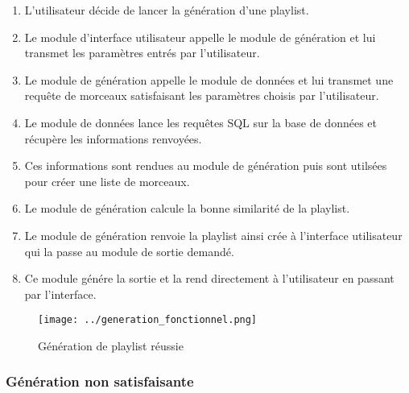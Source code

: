 \begin{enumerate}
\item L'utilisateur décide de lancer la génération d'une playlist.
\item Le module d'interface utilisateur appelle le module de génération et 
lui transmet les paramètres entrés par l'utilisateur.
\item Le module de génération appelle le module de données et lui transmet 
une requête de morceaux satisfaisant les paramètres choisis par l'utilisateur.
\item Le module de données lance les requêtes SQL sur la base de données et
récupère les informations renvoyées.
\item Ces informations sont rendues au module de génération puis sont 
utilsées pour créer une liste de morceaux.
\item Le module de génération calcule la bonne similarité de la playlist.
\item Le module de génération renvoie la playlist ainsi crée à l'interface 
utilisateur qui la passe au module de sortie demandé.
\item Ce module génére la sortie et la rend directement à l'utilisateur en 
passant par l'interface.
\end{enumerate}

\begin{figure}[!h]
\texttt{[image: ../generation\_fonctionnel.png]}
\caption{Génération de playlist réussie}
\end{figure}

\subsubsection{Génération non satisfaisante}


